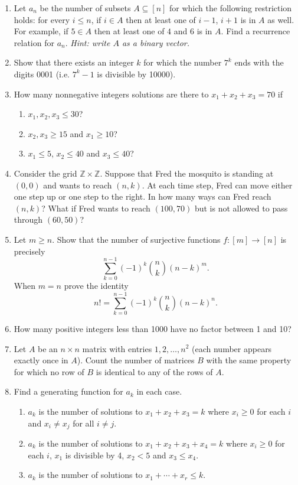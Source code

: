 \documentclass[11pt,letterpaper]{report}
\newcommand{\integers}{\mathbb{Z}}
\begin{document}
\begin{enumerate}
	\item Let $a_n$ be the number of subsets $A\subseteq [n]$ for which the following restriction holds: for every $i\leq n$, if $i\in A$ then at least one of $i-1$, $i+1$ is in $A$ as well. For example, if $5\in A$ then at least one of $4$ and $6$ is in $A$. Find a recurrence relation for $a_n$. \textit{Hint: write $A$ as a binary vector.}

	\item Show that there exists an integer $k$ for which the number $7^k$ ends with the digits 0001 (i.e. $7^k - 1$ is divisible by 10000).
	\item How many nonnegative integers solutions are there to $x_1+x_2+x_3 = 70$ if
	\begin{enumerate}
		\item $x_1, x_2, x_3\leq 30$?
		\item $x_2, x_3\geq 15$ and $x_1\geq 10$?
		\item $x_1\leq 5$, $x_2\leq 40$ and $x_3\leq 40$?
	\end{enumerate}

	\item Consider the grid $\integers\times \integers$. Suppose that Fred the mosquito is standing at $(0, 0)$ and wants to reach $(n, k)$. At each time step, Fred can move either one step up or one step to the right. In how many ways can Fred reach $(n, k)$? What if Fred wants to reach $(100, 70)$ but is not allowed to pass through $(60, 50)$?
	\item Let $m\geq n$. Show that the number of surjective functions $f:[m]\to [n]$ is precisely
	\[
	\sum_{k=0}^{n-1}(-1)^k\binom{n}{k}(n-k)^m.
	\] 
	When $m = n$ prove the identity
	\[
	n!=\sum_{k=0}^{n-1}(-1)^k\binom{n}{k}(n-k)^n.
	\]
	\item How many positive integers less than 1000 have no factor between 1 and 10?
	\item Let $A$ be an $n\times n$ matrix with entries $1, 2, \ldots, n^2$ (each number appears exactly once in $A$). Count the number of matrices $B$ with the same property for which no row of $B$ is identical to any of the rows of $A$.

	\item Find a generating function for $a_k$ in each case.
	\begin{enumerate}
		\item $a_k$ is the number of solutions to $x_1+x_2+x_3 = k$ where $x_i\geq 0$ for each $i$ and $x_i\neq x_j$ for all $i\neq j$.
		\item $a_k$ is the number of solutions to $x_1+x_2+x_3+x_4 = k$ where $x_i\geq 0$ for each $i$, $x_1$ is divisible by 4, $x_2<5$ and $x_3\leq x_4$.
		\item $a_k$ is the number of solutions to $x_1 + \cdots + x_r\leq k$.
	\end{enumerate}


\end{enumerate}
\end{document}
